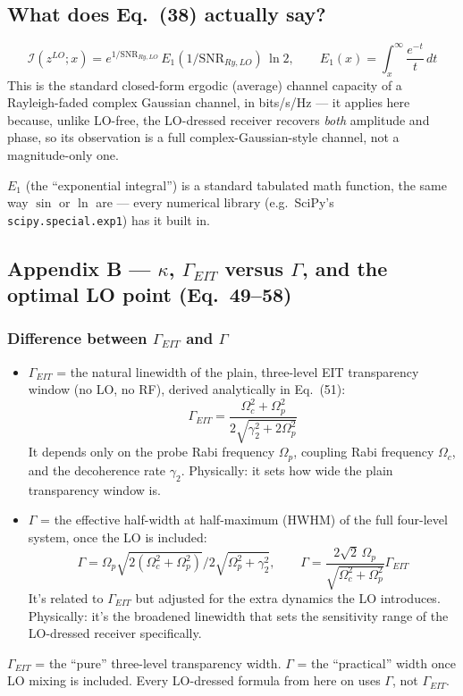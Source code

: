 \documentclass[11pt]{article}
\begin{document}
\subsection*{What does Eq.~(38) actually say?}
\[
\mathcal{I}(z^{LO};x) = e^{1/\text{SNR}_{Ry,LO}}\,E_1(1/\text{SNR}_{Ry,LO})\,\ln 2, \qquad E_1(x)=\int_x^\infty\frac{e^{-t}}{t}\,dt
\]
This is the standard closed-form ergodic (average) channel capacity of a Rayleigh-faded complex Gaussian channel, in bits/s/Hz --- it applies here because, unlike LO-free, the LO-dressed receiver recovers \emph{both} amplitude and phase, so its observation is a full complex-Gaussian-style channel, not a magnitude-only one.
\begin{plain}
$E_1$ (the ``exponential integral'') is a standard tabulated math function, the same way $\sin$ or $\ln$ are --- every numerical library (e.g.\ SciPy's \texttt{scipy.special.exp1}) has it built in.
\end{plain}

\subsection{Appendix B --- $\kappa$, $\Gamma_{EIT}$ versus $\Gamma$, and the optimal LO point (Eq.~49--58)}

\subsubsection*{Difference between $\Gamma_{EIT}$ and $\Gamma$}
\begin{itemize}
\item $\Gamma_{EIT}$ = the natural linewidth of the plain, three-level EIT transparency window (no LO, no RF), derived analytically in Eq.~(51):
\[
\Gamma_{EIT}=\frac{\Omega_c^2+\Omega_p^2}{2\sqrt{\gamma_2^2+2\Omega_p^2}}
\]
It depends only on the probe Rabi frequency $\Omega_p$, coupling Rabi frequency $\Omega_c$, and the decoherence rate $\gamma_2$. Physically: it sets how wide the plain transparency window is.
\item $\Gamma$ = the effective half-width at half-maximum (HWHM) of the full four-level system, once the LO is included:
\[
\Gamma = \Omega_p\sqrt{2(\Omega_c^2+\Omega_p^2)}\Big/2\sqrt{\Omega_p^2+\gamma_2^2}, \qquad \Gamma = \frac{2\sqrt2\,\Omega_p}{\sqrt{\Omega_c^2+\Omega_p^2}}\Gamma_{EIT}
\]
It's related to $\Gamma_{EIT}$ but adjusted for the extra dynamics the LO introduces. Physically: it's the broadened linewidth that sets the sensitivity range of the LO-dressed receiver specifically.
\end{itemize}
\begin{takeaway}
$\Gamma_{EIT}$ = the ``pure'' three-level transparency width. $\Gamma$ = the ``practical'' width once LO mixing is included. Every LO-dressed formula from here on uses $\Gamma$, not $\Gamma_{EIT}$.
\end{takeaway}
\end{document}
